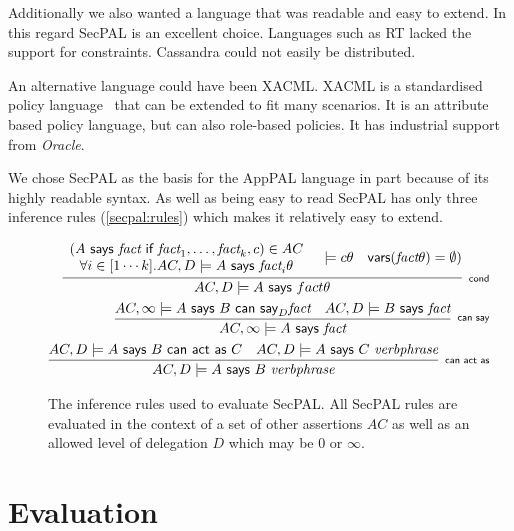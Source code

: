 \documentclass[thesis.tex]{subfiles}
\begin{document}
Additionally we also wanted a language that was readable and easy to extend.
In this regard SecPAL is an excellent choice.  Languages such as RT lacked the support for constraints.  Cassandra could not easily be distributed. 

An alternative language could have been XACML.  XACML is a standardised policy language~\cite{oasis_extensibl:qe_2013} that can be extended to fit many scenarios.  It is an attribute based policy language, but can also role-based policies.  It has industrial support from \emph{Oracle}.

We chose SecPAL as the basis for the AppPAL language in part because of its highly readable syntax.
As well as being easy to read SecPAL has only three inference rules (\autoref{secpal:rules}) which makes it relatively easy to extend. 


\begin{figure}
  \centering
  \begin{eqnarray*}
    \infer[\textsf{\scriptsize cond}]{%
      AC, D \models A\textsf{~says~}fact\theta
    }{%
      \begin{array}[c]{c}
        \left(A\textsf{~says~}\textit{fact}\textsf{~if~}\textit{fact}_1, \ldots, \textit{fact}_k, c\right) \in AC \\
        \forall i \in [1\cdots k]. AC,D\models A\textsf{~says~}\textit{fact}_i\theta
      \end{array}
      & \models{c\theta}
      & \textsf{vars}(\textit{fact}\theta) = \emptyset)
    }\\
    \infer[\textsf{\scriptsize can say}]{%
      AC, \infty \models A\textsf{~says~}\textit{fact}
    }{%
      AC, \infty \models A\textsf{~says~}B\textsf{~can~say}_D \textit{fact}
      & AC, D \models B\textsf{~says~}\textit{fact}
    } \\
    \infer[\textsf{\scriptsize can act as}]{%
      AC, D \models A\textsf{~says~}B~\textit{verbphrase}
    }{%
      AC, D \models A\textsf{~says~}B\textsf{~can~act~as~}C
      & AC, D \models A\textsf{~says~}C~\textit{verbphrase}
    }
  \end{eqnarray*}
  \caption[Inference rules used to evaluate {SecPAL}.]{The inference rules used to evaluate {SecPAL}. All {SecPAL} rules are
  evaluated in the context of a set of other assertions $AC$ as well as an
  allowed level of delegation $D$ which may be $0$ or $\infty$.}
\label{secpal:rules}
\end{figure}

\section{Evaluation}
\end{document}
